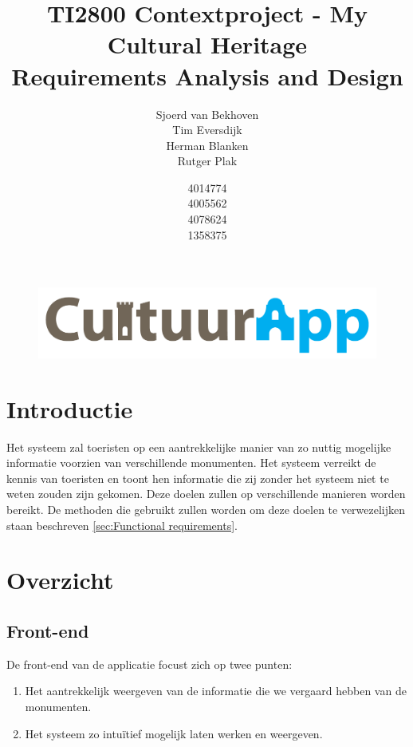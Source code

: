 \documentclass[a4paper,10pt]{article}
\newcommand{\rsection}[1]{
\section{#1}\label{sec:#1}
}
\newcommand{\rsubsection}[1]{
\subsection{#1}\label{sec:sub:#1}
}
\begin{document}
\title{TI2800 Contextproject - My Cultural Heritage\\ Requirements Analysis and Design}
\author{Sjoerd van Bekhoven\\ Tim Eversdijk \\ Herman Blanken \\ Rutger Plak \and 4014774 \\ 4005562 \\ 4078624 \\ 1358375}

\maketitle
\setcounter{page}{0}
\thispagestyle{empty}
\vspace{10cm}
\begin{figure}[ht!]
	\centering
	\includegraphics[width=\textwidth]{cultuurapp-logo.png}
\end{figure}
\clearpage
\clearpage
\tableofcontents

\clearpage
\rsection{Introductie}
Het systeem  zal toeristen  op een aantrekkelijke manier van zo nuttig mogelijke informatie voorzien van verschillende monumenten. Het systeem verreikt de kennis van toeristen en toont hen informatie die zij zonder het systeem niet te weten zouden zijn gekomen. Deze doelen zullen op verschillende manieren worden bereikt. De methoden die gebruikt zullen worden om deze doelen te verwezelijken staan beschreven \ref{sec:Functional requirements}.

\rsection{Overzicht}
	\rsubsection{Front-end}
	De front-end van de applicatie focust zich op twee punten:
	\begin{enumerate}
		\item Het aantrekkelijk weergeven van de informatie die we vergaard hebben van de monumenten.
		\item Het systeem zo intu\"itief mogelijk laten werken en weergeven.
	\end{enumerate}
				
\end{document}
